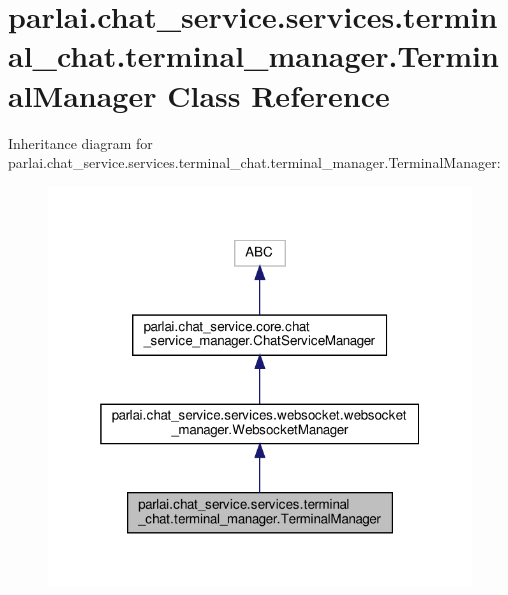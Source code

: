 \hypertarget{classparlai_1_1chat__service_1_1services_1_1terminal__chat_1_1terminal__manager_1_1TerminalManager}{}\section{parlai.\+chat\+\_\+service.\+services.\+terminal\+\_\+chat.\+terminal\+\_\+manager.\+Terminal\+Manager Class Reference}
\label{classparlai_1_1chat__service_1_1services_1_1terminal__chat_1_1terminal__manager_1_1TerminalManager}


Inheritance diagram for parlai.\+chat\+\_\+service.\+services.\+terminal\+\_\+chat.\+terminal\+\_\+manager.\+Terminal\+Manager\+:
\nopagebreak
\begin{figure}[H]
\begin{center}
\leavevmode
\includegraphics[width=319pt]{dd/df9/classparlai_1_1chat__service_1_1services_1_1terminal__chat_1_1terminal__manager_1_1TerminalManager__inherit__graph}
\end{center}
\end{figure}


